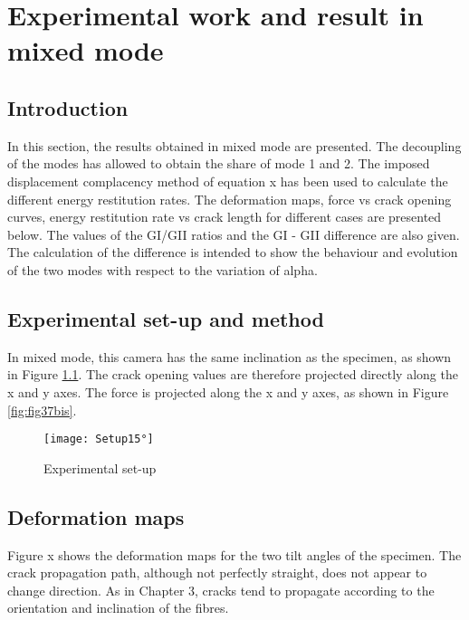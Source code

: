 \chapter{Experimental work and result in mixed mode}
\label{Chapter2}

\section{Introduction}

In this section, the results obtained in mixed mode are presented. The decoupling of the modes has allowed to obtain the share of mode 1 and 2. The imposed displacement complacency method of equation x has been used to calculate the different energy restitution rates. The deformation maps, force vs crack opening curves, energy restitution rate vs crack length for different cases are presented below. The values of the GI/GII ratios and the GI - GII difference are also given. The calculation of the difference is intended to show the behaviour and evolution of the two modes with respect to the variation of alpha.

\section{Experimental set-up and method}

In mixed mode, this camera has the same inclination as the specimen, as shown in Figure \ref{fig:Setup15°}. The crack opening values are therefore projected directly along the x and y axes. The force is projected along the x and y axes, as shown in Figure \ref{fig:fig37bis}.

\begin{figure}[htp]
	\centering
	\texttt{[image: Setup15°]}
	\caption{Experimental set-up}
	\label{fig:Setup15°}
\end{figure}

\section{Deformation maps}

Figure x shows the deformation maps for the two tilt angles of the specimen. The crack propagation path, although not perfectly straight, does not appear to change direction. As in Chapter 3, cracks tend to propagate according to the orientation and inclination of the fibres.

